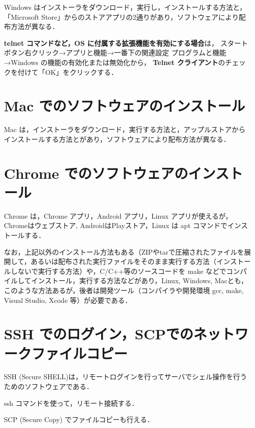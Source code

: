 Windows はインストーラをダウンロード，実行し，インストールする方法と，「Microsoft Store」からのストアアプリの2通りがあり，ソフトウェアにより配布方法が異なる．

\textbf{telnet コマンドなど，OS に付属する拡張機能を有効にする場合}は，
スタートボタン右クリック→アプリと機能→一番下の関連設定 プログラムと機能→Windows の機能の有効化または無効化から，
\textbf{Telnet クライアント}のチェックを付けて「OK」をクリックする．

\section{Mac でのソフトウェアのインストール}

Mac は，インストーラをダウンロード，実行する方法と，アップルストアからインストールする方法とがあり，ソフトウェアにより配布方法が異なる．

\section{Chrome でのソフトウェアのインストール}

Chrome は，Chrome アプリ，Android アプリ，Linux アプリが使えるが，Chromeはウェブストア, AndroidはPlayストア，Linux は apt コマンドでインストールする．

なお，上記以外のインストール方法もある（ZIPやtarで圧縮されたファイルを展開して，あるいは配布された実行ファイルをそのまま実行する方法（インストールしないで実行する方法）や，C/C++等のソースコードを make などでコンパイルしてインストール，実行する方法などがあり，Linux, Windows, Macとも，このような方法あるが，後者は開発ツール（コンパイラや開発環境 gcc, make, Visual Studio, Xcode 等）が必要である．

\section{SSH でのログイン，SCPでのネットワークファイルコピー}

SSH (Secure SHELL)は，リモートログインを行ってサーバでシェル操作を行うためのソフトウェアである．

ssh コマンドを使って，リモート接続する．


SCP (Secure Copy) でファイルコピーも行える．

